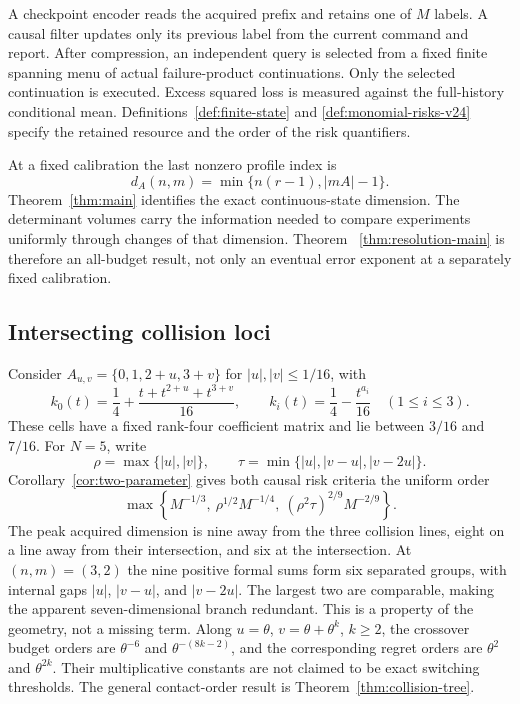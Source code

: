 A checkpoint encoder reads the acquired prefix and retains one of $M$
labels. A causal filter updates only its previous label from the current
command and report. After compression, an independent query is selected
from a fixed finite spanning menu of actual failure-product
continuations. Only the selected continuation is executed. Excess
squared loss is measured against the full-history conditional mean.
Definitions~\ref{def:finite-state} and
\ref{def:monomial-risks-v24} specify the retained resource and the
order of the risk quantifiers.



At a fixed calibration the last nonzero profile index is
\[
             d_A(n,m)=\min\{n(r-1),|mA|-1\}.
\]
Theorem~\ref{thm:main} identifies the exact continuous-state dimension.
The determinant volumes carry the information needed to compare
experiments uniformly through changes of that dimension. Theorem~
\ref{thm:resolution-main} is therefore an all-budget result, not only
an eventual error exponent at a separately fixed calibration.

\subsection{Intersecting collision loci}
\label{sec:early-collision-example}
Consider $A_{u,v}=\{0,1,2+u,3+v\}$ for $|u|,|v|\le1/16$, with
\[
 k_0(t)=\frac14+\frac{t+t^{2+u}+t^{3+v}}{16},\qquad
 k_i(t)=\frac14-\frac{t^{a_i}}{16}\quad(1\le i\le3).
\]
These cells have a fixed rank-four coefficient matrix and lie between
$3/16$ and $7/16$. For $N=5$, write
\[
 \rho=\max\{|u|,|v|\},\qquad
 \tau=\min\{|u|,|v-u|,|v-2u|\}.
\]
Corollary~\ref{cor:two-parameter} gives both causal risk criteria the
uniform order
\begin{equation}\label{eq:early-two-parameter-v24}
 \max\left\{M^{-1/3},\ \rho^{1/2}M^{-1/4},\
                    (\rho^2\tau)^{2/9}M^{-2/9}\right\}.
\end{equation}
The peak acquired dimension is nine away from the three collision
lines, eight on a line away from their intersection, and six at the
intersection. At $(n,m)=(3,2)$ the nine positive formal sums form six
separated groups, with internal gaps $|u|$, $|v-u|$, and $|v-2u|$.
The largest two are comparable, making the apparent seven-dimensional
branch redundant. This is a property of the geometry, not a missing
term. Along $u=\theta$, $v=\theta+\theta^k$, $k\ge2$, the crossover
budget orders are $\theta^{-6}$ and $\theta^{-(8k-2)}$, and the
corresponding regret orders are $\theta^2$ and $\theta^{2k}$.
Their multiplicative constants are not claimed to be exact switching
thresholds. The general contact-order result is
Theorem~\ref{thm:collision-tree}.

